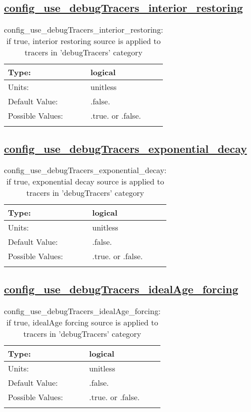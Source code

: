 \subsection[config\_use\_debugTracers\_interior\_restoring]{\hyperref[sec:nm_tab_tracer_forcing_debugTracers]{config\_use\_debugTracers\_interior\_restoring}}
\label{subsec:nm_sec_config_use_debugTracers_interior_restoring}
\begin{center}
\begin{longtable}{| p{2.0in} || p{4.0in} |}
    \hline
    Type: & logical \\
    \hline
    Units: & \si{unitless} \\
    \hline
    Default Value: & .false. \\
    \hline
    Possible Values: & .true. or .false. \\
    \hline
    \caption{config\_use\_debugTracers\_interior\_restoring: if true, interior restoring source is applied to tracers in 'debugTracers' category}
\end{longtable}
\end{center}
\subsection[config\_use\_debugTracers\_exponential\_decay]{\hyperref[sec:nm_tab_tracer_forcing_debugTracers]{config\_use\_debugTracers\_exponential\_decay}}
\label{subsec:nm_sec_config_use_debugTracers_exponential_decay}
\begin{center}
\begin{longtable}{| p{2.0in} || p{4.0in} |}
    \hline
    Type: & logical \\
    \hline
    Units: & \si{unitless} \\
    \hline
    Default Value: & .false. \\
    \hline
    Possible Values: & .true. or .false. \\
    \hline
    \caption{config\_use\_debugTracers\_exponential\_decay: if true, exponential decay source is applied to tracers in 'debugTracers' category}
\end{longtable}
\end{center}
\subsection[config\_use\_debugTracers\_idealAge\_forcing]{\hyperref[sec:nm_tab_tracer_forcing_debugTracers]{config\_use\_debugTracers\_idealAge\_forcing}}
\label{subsec:nm_sec_config_use_debugTracers_idealAge_forcing}
\begin{center}
\begin{longtable}{| p{2.0in} || p{4.0in} |}
    \hline
    Type: & logical \\
    \hline
    Units: & \si{unitless} \\
    \hline
    Default Value: & .false. \\
    \hline
    Possible Values: & .true. or .false. \\
    \hline
    \caption{config\_use\_debugTracers\_idealAge\_forcing: if true, idealAge forcing source is applied to tracers in 'debugTracers' category}
\end{longtable}
\end{center}

